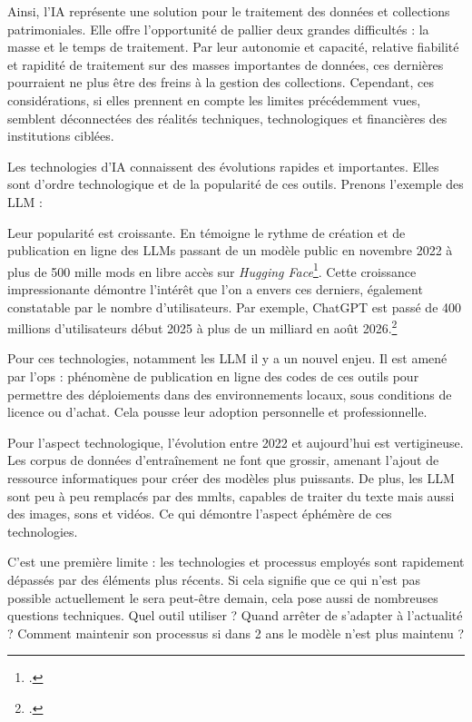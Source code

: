 
Ainsi, l'\gls{IA} représente une solution pour le traitement des données et collections patrimoniales. Elle offre l'opportunité de pallier deux grandes difficultés : la masse et le temps de traitement. Par leur autonomie et capacité, relative fiabilité et rapidité de traitement sur des masses importantes de données, ces dernières pourraient ne plus être des freins à la gestion des collections. Cependant, ces considérations, si elles prennent en compte les limites précédemment vues, semblent déconnectées des réalités techniques, technologiques et financières des institutions ciblées.\newline

Les technologies d'\gls{IA} connaissent des évolutions rapides et importantes. Elles sont d'ordre technologique et de la popularité de ces outils. Prenons l'exemple des \gls{LLM} : 

Leur popularité est croissante. En témoigne le rythme de création et de publication en ligne des \glspl{LLM} passant de un modèle public en novembre 2022 à plus de 500 mille \glspl{mod} en libre accès sur \textit{Hugging Face}\footcite{StateOpenModels2026}. 
Cette croissance impressionante démontre l'intérêt que l'on a envers ces derniers, également constatable par le nombre d'utilisateurs. Par exemple, ChatGPT est passé de 400 millions d'utilisateurs début 2025 à plus de un milliard en août 2026.\footcite{AIChatGPTStatistics}

Pour ces technologies, notamment les \gls{LLM} il y a un nouvel enjeu. Il est amené par l'\gls{ops} : phénomène de publication en ligne des codes de ces outils pour permettre des déploiements dans des environnements locaux, sous conditions de licence ou d'achat. Cela pousse leur adoption personnelle et professionnelle.

Pour l'aspect technologique, l'évolution entre 2022 et aujourd'hui est vertigineuse. Les corpus de données d'entraînement ne font que grossir, amenant l'ajout de ressource informatiques pour créer des modèles plus puissants. De plus, les \gls{LLM}  sont peu à peu remplacés par des \gls{mmlts}, capables de traiter du texte mais aussi des images, sons et vidéos. Ce qui démontre l'aspect éphémère de ces technologies. 

C'est une première limite : les technologies et processus employés sont rapidement dépassés par des éléments plus récents. Si cela signifie que ce qui n'est pas possible actuellement le sera peut-être demain, cela pose aussi de nombreuses questions techniques. Quel outil utiliser ? Quand arrêter de s'adapter à l'actualité ? Comment maintenir son processus si dans 2 ans le modèle n'est plus maintenu ?\newline

